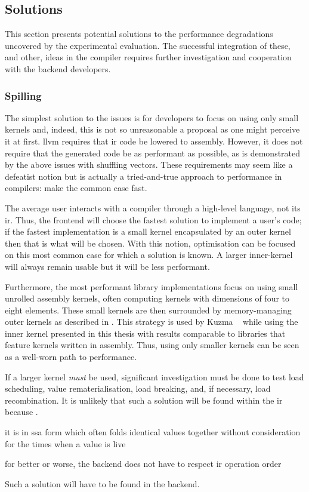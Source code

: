 \documentclass[\main/thesis.tex]{subfiles}
\begin{document}
\subsection{Solutions}
This section presents potential solutions to the performance degradations uncovered by the experimental evaluation. 
The successful integration of these, and other, ideas in the compiler requires further investigation and cooperation with the backend developers.

\subsubsection{Spilling}
\label{sec:spillSolution}
The simplest solution to the  issues is for developers to focus on using only small kernels and, indeed, this is not so unreasonable a proposal as one might perceive it at first.
\gls{llvm} requires that \gls{ir} code be lowered to assembly.
However, it does not require that the generated code be as performant as possible, as is demonstrated by the above issues with shuffling  vectors.
These requirements may seem like a defeatist notion but is actually a tried-and-true approach to performance in compilers: make the common case fast.

The average user interacts with a compiler through a high-level language, not its \gls{ir}.
Thus, the frontend will choose the fastest solution to implement a user's code; if the fastest implementation is a small kernel encapsulated by an outer kernel then that is what will be chosen.
With this notion, optimisation can be focused on this most common case for which a solution is known.
A larger inner-kernel will always remain usable but it will be less performant.

Furthermore, the most performant library implementations focus on using small unrolled assembly kernels, often computing kernels with dimensions of four to eight elements.
These small kernels are then surrounded by memory-managing outer kernels as described in .
This strategy is used by Kuzma \etal~\autocite{kuzma2021fast} while using the inner kernel presented in this thesis with results comparable to libraries that feature kernels written in assembly.
Thus, using only smaller kernels can be seen as a well-worn path to performance.

If a larger kernel \emph{must} be used, significant investigation must be done to test load scheduling, value \gls{rematerialisation}, load breaking, and, if necessary, load recombination.
It is unlikely that such a solution will be found within the \gls{ir} because .
\begin{enumerate*}[itemjoin={{; }}, itemjoin*={{; and }}, label=(\arabic*), after={.}]
  \item it is in \gls{ssa} form which often folds identical values together without consideration for the times when a value is \gls{live}
  \item for better or worse, the backend does not have to respect \gls{ir} operation order
\end{enumerate*}
Such a solution will have to be found in the backend.
\end{document}
